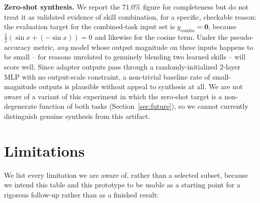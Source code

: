 \documentclass[11pt]{article}
\begin{document}
\textbf{Zero-shot synthesis.} We report the 71.0\% figure for completeness but do not treat it as validated evidence of skill combination, for a specific, checkable reason: the evaluation target for the combined-task input set is $y_{\text{combo}} = \mathbf{0}$, because $\tfrac{1}{2}(\sin x + (-\sin x)) = 0$ and likewise for the cosine term. Under the pseudo-accuracy metric, \emph{any} model whose output magnitude on these inputs happens to be small -- for reasons unrelated to genuinely blending two learned skills -- will score well. Since adapter outputs pass through a randomly-initialized 2-layer MLP with no output-scale constraint, a non-trivial baseline rate of small-magnitude outputs is plausible without appeal to synthesis at all. We are not aware of a variant of this experiment in which the zero-shot target is a non-degenerate function of both tasks (Section~\ref{sec:future}), so we cannot currently distinguish genuine synthesis from this artifact.

\section{Limitations}
\label{sec:limitations}

We list every limitation we are aware of, rather than a selected subset, because we intend this table and this prototype to be usable as a starting point for a rigorous follow-up rather than as a finished result:
\end{document}

